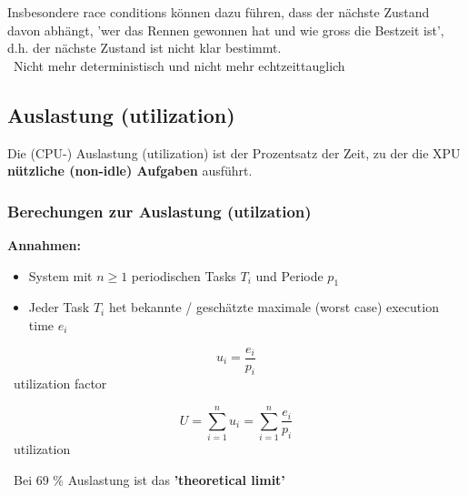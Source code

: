\vspace{0.2cm}

Insbesondere race conditions können dazu führen, dass der nächste Zustand davon abhängt, 'wer das
Rennen gewonnen hat und wie gross die Bestzeit ist', d.h. der nächste Zustand ist nicht klar bestimmt.\\
\textrightarrow\ Nicht mehr deterministisch und nicht mehr echtzeittauglich


\subsection{Auslastung (utilization)}

Die (CPU-) Auslastung (utilization) ist der Prozentsatz der Zeit, zu der die XPU \textbf{nützliche (non-idle) Aufgaben} ausführt. 


\subsubsection{Berechungen zur Auslastung (utilzation)}

\textbf{Annahmen:}

\begin{itemize}
    \item System mit $n \geq 1$ periodischen Tasks $T_i$ und Periode $p_1$
    \item Jeder Task $T_i$ het bekannte / geschätzte maximale (worst case) execution time $e_i$
\end{itemize}

\vspace{0.2cm}

\begin{minipage}[t]{0.48\columnwidth}
    \begin{center}
        $$ u_i = \frac{e_i}{p_i} $$
        \textrightarrow\ utilization factor
    \end{center}
\end{minipage}
\hfill
\begin{minipage}[t]{0.48\columnwidth}
    \begin{center}
        $$ U = \sum\limits_{i=1}^n u_i = \sum\limits_{i=1}^n \frac{e_i}{p_i} $$
        \textrightarrow\ utilization
    \end{center}
\end{minipage}

\vspace{0.2cm}
\textrightarrow\ Bei 69 \% Auslastung ist das  \textbf{'theoretical limit'} %



